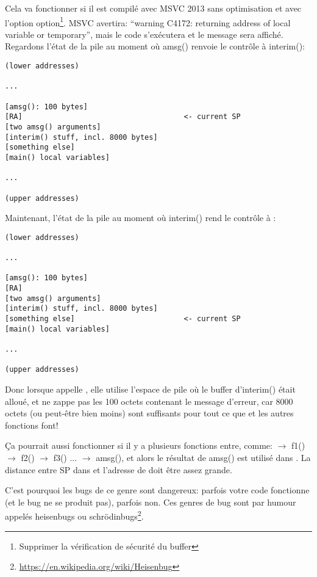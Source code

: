 Cela va fonctionner si il est compilé avec MSVC 2013 sans optimisation et avec l'option
 option\footnote{Supprimer la vérification de sécurité du buffer}.
MSVC avertira: ``warning C4172: returning address of local variable or temporary'',
mais le code s'exécutera et le message sera affiché.
Regardons l'état de la pile au moment où amsg() renvoie le contrôle à interim():

\begin{lstlisting}
(lower addresses)

...

[amsg(): 100 bytes]
[RA]                                     <- current SP
[two amsg() arguments]
[interim() stuff, incl. 8000 bytes]
[something else]
[main() local variables]

...

(upper addresses)
\end{lstlisting}

Maintenant, l'état de la pile au moment où interim() rend le contrôle à \main{}:

\begin{lstlisting}
(lower addresses)

...

[amsg(): 100 bytes]
[RA]
[two amsg() arguments]
[interim() stuff, incl. 8000 bytes]
[something else]                         <- current SP
[main() local variables]

...

(upper addresses)
\end{lstlisting}

Donc lorsque \main appelle \printf, elle utilise l'espace de pile où le buffer d'interim()
était alloué, et ne zappe pas les 100 octets contenant le message d'erreur, car 8000
octets (ou peut-être bien moins) sont suffisants pour tout ce que \printf et les autres
fonctions font!

Ça pourrait aussi fonctionner si il y a plusieurs fonctions entre, comme:
\main $\rightarrow$ f1() $\rightarrow$ f2() $\rightarrow$ f3() ... $\rightarrow$ amsg(),
et alors le résultat de amsg() est utilisé dans \main.
La distance entre \ac{SP} dans \main et l'adresse de  doit être assez grande.

C'est pourquoi les bugs de ce genre sont dangereux: parfois votre code fonctionne
(et le bug ne se produit pas), parfois non.
\label{heisenbug}
Ces genres de bug sont par humour appelés heisenbugs ou schrödinbugs\footnote{\url{https://en.wikipedia.org/wiki/Heisenbug}}.
